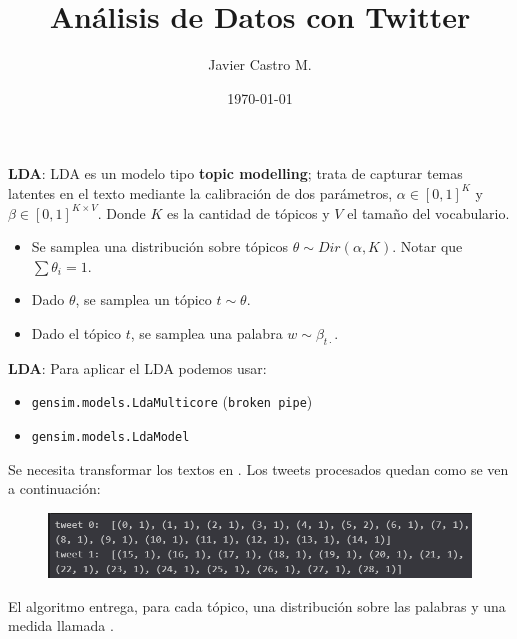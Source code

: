 \documentclass{beamer}
\title[Análisis de Datos con Twitter]{Análisis de Datos con Twitter}
\author{Javier Castro M.}
\institute{Universidad De Chile}
\date{\today}
\begin{document}
	
	\maketitle
	
	\begin{frame}{\textbf{LDA}: }
		LDA es un modelo tipo \textbf{topic modelling}; trata de capturar temas latentes en el texto mediante la calibración de dos parámetros, $\alpha\in [0,1]^{K}$ y $\beta \in [0,1]^{K\times V}$. Donde $K$ es la cantidad de tópicos y $V$ el tamaño del vocabulario. 
		
		\begin{itemize}
			\item Se samplea una distribución sobre tópicos $\theta\sim Dir(\alpha, K)$. Notar que $\sum \theta_i = 1$.
			\item Dado $\theta$, se samplea un tópico $t\sim\theta$.
			\item Dado el tópico $t$, se samplea una palabra $w\sim\beta_{t\cdot}$.
		\end{itemize}
		
		
	\end{frame}

	\begin{frame}{\textbf{LDA}: }
		Para aplicar el LDA podemos usar:
		\begin{itemize}
			\item \texttt{gensim.models.LdaMulticore} (\texttt{broken pipe})
			\item \texttt{gensim.models.LdaModel} 
		\end{itemize}
		Se necesita transformar los textos en . Los tweets procesados quedan como se ven a continuación:
		
		\begin{figure}[h]
			\centering
			\includegraphics[scale=.5]{../imgs/segunda_avance/bow_tweets_ex.png}
		\end{figure} 
	
		El algoritmo entrega, para cada tópico, una distribución sobre las palabras y una medida llamada . 
		
	\end{frame}
\end{document}
